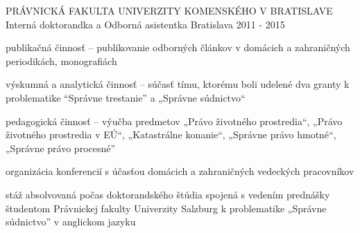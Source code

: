 \begin{cventries}
  \cventry
    {PRÁVNICKÁ FAKULTA UNIVERZITY KOMENSKÉHO V BRATISLAVE} %
    {Interná doktorandka a Odborná asistentka} %
    {Bratislava} %
    {2011 - 2015} %
    {
      \begin{cvitems} %
        \item {publikačná činnosť – publikovanie odborných článkov v domácich a zahraničných periodikách, monografiách}
        \item {výskumná a analytická činnosť – súčasť tímu, ktorému boli udelené dva granty k problematike “Správne trestanie” a „Správne súdnictvo“}
        \item {pedagogická činnosť – výučba predmetov „Právo životného prostredia“, „Právo životného prostredia v EÚ“, „Katastrálne konanie“, „Správne právo hmotné“, „Správne právo procesné”}
        \item {organizácia konferencií s účasťou domácich a zahraničných vedeckých pracovníkov}
        \item {stáž absolvovaná počas doktorandského štúdia spojená s vedením prednášky študentom Právnickej fakulty Univerzity Salzburg k problematike „Správne súdnictvo” v anglickom jazyku}
      \end{cvitems}
    }

\end{cventries}

